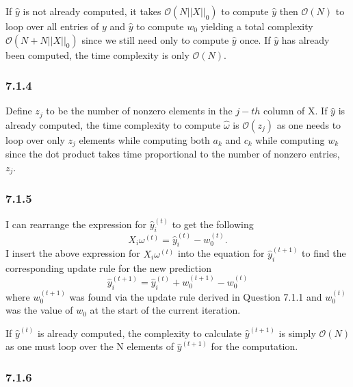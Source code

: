 \documentclass[12pt]{amsart}
\begin{document}
If $\hat{y}$ is not already computed, it takes $\mathcal{O}(N ||X||_0)$ to compute $\hat{y}$ then $\mathcal{O}(N)$ to loop over all entries of $y$ and $\hat{y}$ to compute $w_0$ yielding a total complexity $\mathcal{O}(N + N||X||_0)$ since we still need only to compute $\hat{y}$ once.  If $\hat{y}$ has already been computed, the time complexity is only $\mathcal{O}(N)$. 

\subsubsection*{7.1.4}

Define $z_j$ to be the number of nonzero elements in the $j-th$ column of X.  If $\hat{y}$ is already computed, the time complexity to compute $\hat{\omega}$ is $\mathcal{O}(z_j)$ as one needs to loop over only $z_j$ elements while computing both $a_k$ and $c_k$ while computing $w_k$ since the dot product takes time proportional to the number of nonzero entries, $z_j$.

\subsubsection*{7.1.5}

I can rearrange the expression for $\hat{y}_i^{(t)}$ to get the following
\begin{equation}
X_i \omega^{(t)} = \hat{y}_i^{(t)} - w_0^{(t)}.
\end{equation}
I insert the above expression for $X_i \omega^{(t)}$ into the equation for $\hat{y}_i^{(t+1)}$ to find the corresponding update rule for the new prediction
\begin{equation}
\hat{y}_i^{(t+1)} = \hat{y}_i^{(t)} + w_0^{(t+1)} - w_0^{(t)}
\end{equation}
where $w_0^{(t+1)}$ was found via the update rule derived in Question 7.1.1 and $w_0^{(t)}$ was the value of $w_0$ at the start of the current iteration.  

If $\hat{y}^{(t)}$ is already computed, the complexity to calculate $\hat{y}^{(t+1)}$ is simply $\mathcal{O}(N)$ as one must loop over the N elements of $\hat{y}^{(t+1)}$ for the computation.

\subsubsection*{7.1.6}
\end{document}
